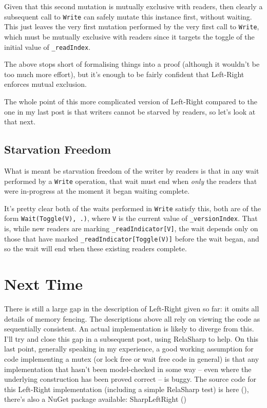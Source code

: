 \documentclass[11pt]{article}
\begin{document}
Given that this second mutation is mutually exclusive with readers, then clearly a subsequent call to \texttt{Write} can safely mutate this instance first, without waiting. This just leaves the very first mutation performed by the very first call to \texttt{Write}, which must be mutually exclusive with readers since it targets the toggle of the initial value of \texttt{\_readIndex}.

The above stops short of formalising things into a proof (although it wouldn't be too much more effort), but it's enough to be fairly confident that Left-Right enforces mutual exclusion. 

The whole point of this more complicated version of Left-Right compared to the one in my last post is that writers cannot be starved by readers, so let's look at that next. 

\subsection{Starvation Freedom}

What is meant be starvation freedom of the writer by readers is that in any wait performed by a \texttt{Write} operation, that wait must end when \emph{only} the readers that were in-progress at the moment it began waiting complete.

It's pretty clear both of the waits performed in \texttt{Write} satisfy this, both are of the form \texttt{Wait(Toggle(V), .)}, where \texttt{V} is the current value of \texttt{\_versionIndex}. That is, while new readers are marking \texttt{\_readIndicator[V]}, the wait depends only on those that have marked \texttt{\_readIndicator[Toggle(V)]} before the wait began, and so the wait will end when these existing readers complete.

\section{Next Time}

There is still a large gap in the description of Left-Right given so far: it omits all details of memory fencing. The descriptions above all rely on viewing the code as sequentially consistent. An actual implementation is likely to diverge from this. I'll try and close this gap in a subsequent post, using RelaSharp to help. On this last point, generally speaking in my experience, a good working assumption for code implementing a mutex (or lock free or wait free code in general) is that any implementation that hasn't been model-checked in some way -- even where the underlying construction has been proved correct -- is buggy. The source code for this Left-Right implementation (including a simple RelaSharp test) is here (\texttt{}), there's also a NuGet package available: SharpLeftRight (\texttt{})
\end{document}
